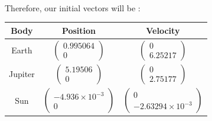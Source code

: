 \documentclass[a4paper, twoside, 11pt]{report}
\theoremstyle{theorem}
\theoremstyle{remark}
\theoremstyle{exemple}
\begin{document}
            \paragraph{}Therefore, our initial vectors will be :
            \begin{center}           
                \begin{tabular}{|c|c|c|}
                        \hline
                    Body & Position & Velocity \\
                        \hline
                    Earth & $\left(\begin{array}{c}
                        0.995064 \\
                        0
                        \end{array}\right)$ 
                        & $\left(\begin{array}{c}
                        0 \\
                        6.25217
                        \end{array}\right)$\\
                        \hline
                    Jupiter & $\left(\begin{array}{c}
                        5.19506 \\
                        0
                        \end{array}\right)$ 
                        & $\left(\begin{array}{c}
                        0 \\
                        2.75177
                        \end{array}\right)$\\
                        \hline
                    Sun & $\left(\begin{array}{c}
                        -4.936 \times 10^{-3} \\
                        0
                        \end{array}\right)$ 
                        & $\left(\begin{array}{c}
                        0 \\
                        -2.63294 \times 10^{-3}
                        \end{array}\right)$ \\
                        \hline
                \end{tabular}
            \end{center}
\end{document}
